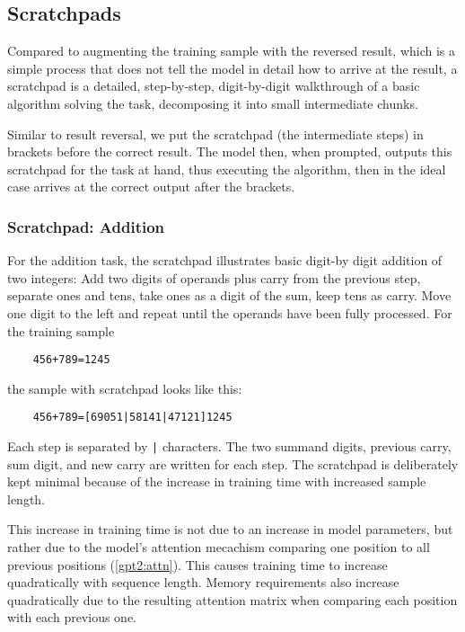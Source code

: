\subsection{Scratchpads}
\label{arith:scratchpad}


Compared to augmenting the training sample with the reversed result, which is a simple process that does not tell the model in detail how to arrive at the result, a scratchpad is a detailed, step-by-step, digit-by-digit walkthrough of a basic algorithm solving the task, decomposing it into small intermediate chunks.

Similar to result reversal, we put the scratchpad (the intermediate steps) in brackets before the correct result. The model then, when prompted, outputs this scratchpad for the task at hand, thus executing the algorithm, then in the ideal case arrives at the correct output after the brackets.

\subsubsection{Scratchpad: Addition}
\label{add_scratchpad}

For the addition task, the scratchpad illustrates basic digit-by digit addition of two integers: Add two digits of operands plus carry from the previous step, separate ones and tens, take ones as a digit of the sum, keep tens as carry. Move one digit to the left and repeat until the operands have been fully processed. For the training sample

\begin{lstlisting}
	456+789=1245
\end{lstlisting}

\noindent
the sample with scratchpad looks like this:

\begin{lstlisting}
	456+789=[69051|58141|47121]1245
\end{lstlisting}

\noindent
Each step is separated by \verb!|! characters. The two summand digits, previous carry, sum digit, and new carry are written for each step.
The scratchpad is deliberately kept minimal because of the increase in training time with increased sample length.

\label{training_time_growth}
This increase in training time is not due to an increase in model parameters, but rather due to the model's attention mecachism comparing one position to all previous positions (\cref{gpt2:attn}). This causes training time to increase quadratically with sequence length. Memory requirements also increase quadratically due to the resulting attention matrix when comparing each position with each previous one.

